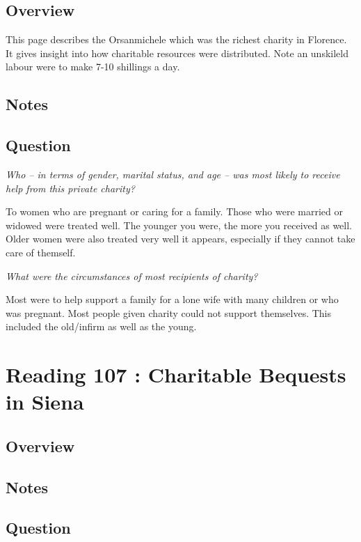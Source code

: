 \documentclass[12pt]{article}
\begin{document}
\subsection*{Overview}

This page describes the Orsanmichele which was the richest charity in Florence. It gives insight into how charitable resources were distributed. Note an unskileld labour were to make 7-10 shillings a day.

\subsection*{Notes}

\subsection*{Question}

\textit{Who -- in terms of gender, marital status, and age -- was most likely to receive help from this private charity?}

To women who are pregnant or caring for a family. Those who were married or widowed were treated well. The younger you were, the more you received as well. Older women were also treated very well it appears, especially if they cannot take care of themself.

\textit{What were the circumstances of most recipients of charity?}

Most were to help support a family for a lone wife with many children or who was pregnant.  Most people given charity could not support themselves. This included the old/infirm as well as the young.


\section*{Reading 107 : Charitable Bequests in Siena}

\subsection*{Overview}

\subsection*{Notes}

\subsection*{Question}
\end{document}
